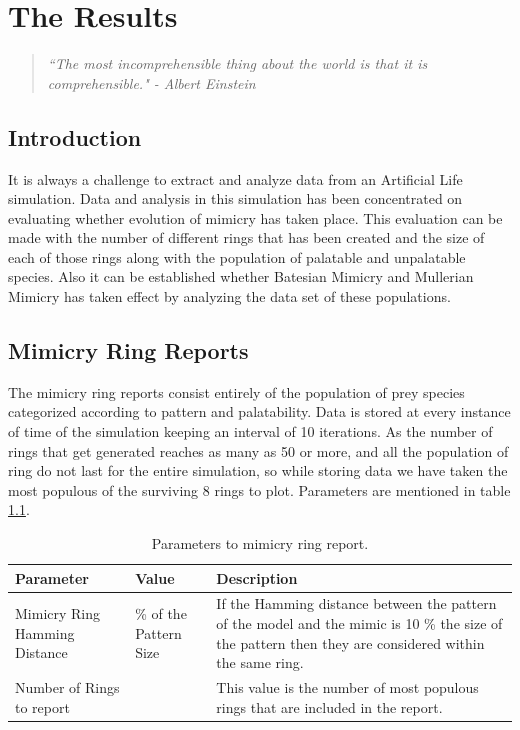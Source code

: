 \chapter{The Results}
\label{chapter:results}
\begin{quote}
\textsl{``The most incomprehensible thing about the world is that it is comprehensible." - Albert Einstein}
\end{quote}

\section{Introduction}
It is always a challenge to extract and analyze data from an Artificial Life simulation. Data and analysis in this simulation has been concentrated on evaluating whether evolution of mimicry has taken place. This evaluation can be made with the number of different rings that has been created and the size of each of those rings along with the population of palatable and unpalatable species. Also it can be established whether Batesian Mimicry and Mullerian Mimicry has taken effect by analyzing the data set of these populations.

\section{Mimicry Ring Reports}
The mimicry ring reports consist entirely of the population of prey species categorized according to pattern and palatability. Data is stored at every instance of time of the simulation keeping an interval of 10 iterations. As the number of rings that get generated reaches as many as 50 or more, and all the population of ring do not last for the entire simulation, so while storing data we have taken the most populous of the surviving 8 rings to plot. Parameters are mentioned in table \ref{tab:ring-report-control-parameters}.

\begin{table}[H]
\centering
\begin{tabular}{| p{2cm} | >{\centering} p{2.2cm} | p{8cm} |}
	\hline
		\textbf{Parameter} & \textbf{Value} & \textbf{Description} \\ \hline
		Mimicry Ring Hamming Distance & 10 \% of the Pattern Size & If the Hamming distance between the pattern of the model and the mimic is 10 \% the size of the pattern then they are considered within the same ring.\\ \hline
		Number of Rings to report & 8 & This value is the number of most populous rings that are included in the report.\\
	\hline
\end{tabular}
\caption{Parameters to mimicry ring report.}
\label{tab:ring-report-control-parameters}
\end{table}

